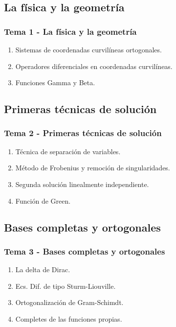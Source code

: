 \documentclass[12pt]{beamer}
\begin{document}
\subsection{La física y la geometría}

\begin{frame}
\frametitle{Tema 1 - La física y la geometría}
\begin{enumerate}[<+->]
\item Sistemas de coordenadas curvilíneas ortogonales.
\item Operadores diferenciales en coordenadas curvilíneas.
\item Funciones Gamma y Beta.
\end{enumerate}
\end{frame}

\subsection{Primeras técnicas de solución}

\begin{frame}
\frametitle{Tema 2 - Primeras técnicas de solución}
\begin{enumerate}[<+->]
\item Técnica de separación de variables.
\item Método de Frobenius y remoción de singularidades.
\item Segunda solución linealmente independiente.
\item Función de Green.
\end{enumerate}
\end{frame}

\subsection{Bases completas y ortogonales}

\begin{frame}
\frametitle{Tema 3 - Bases completas y ortogonales}
\begin{enumerate}[<+->]
\item La delta de Dirac. 
\item Ecs. Dif. de tipo Sturm-Liouville.
\item Ortogonalización de Gram-Schimdt.
\item Completes de las funciones propias.
\end{enumerate}
\end{frame}
\end{document}
